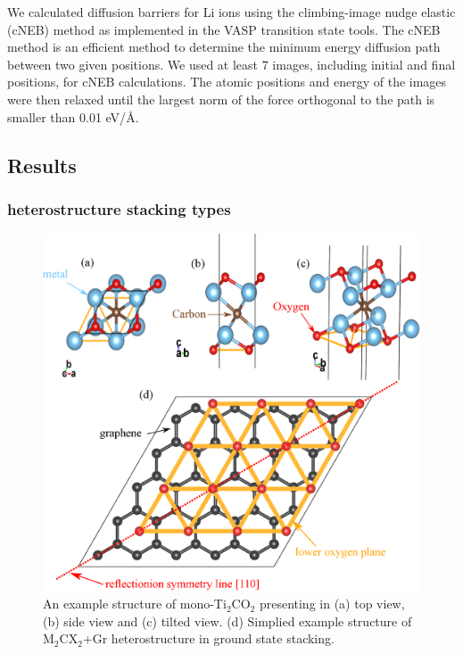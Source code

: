 We calculated diffusion barriers for Li ions using the climbing-image nudge elastic (cNEB) method as implemented in the VASP transition state tools\cite{c-neb1,c-neb2}. The cNEB method is an efficient method to determine the minimum energy diffusion path between two given positions. We used at least 7 images, including initial and final positions, for cNEB calculations. The atomic positions and energy of the images were then relaxed until the largest norm of the force orthogonal to the path is smaller than 0.01 eV/{\AA}. 

\subsection{Results}
\subsubsection{heterostructure stacking types}
\begin{figure}[htb]
\centering
\includegraphics[width=0.8\linewidth]{stacking.eps}%
\caption{An example structure of mono-Ti$_2$CO$_2$ presenting in (a) top view, (b) side view and (c) tilted view. (d)  Simplied example structure of M$_2$CX$_2$+Gr heterostructure in ground state stacking. \label{stacking}}
\end{figure}


